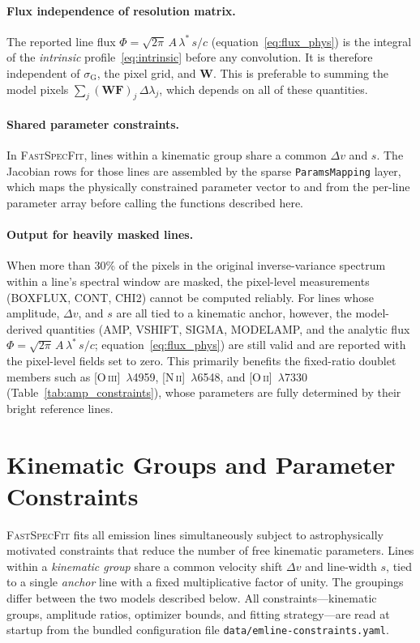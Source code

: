 \documentclass[12pt]{article}
\newcommand{\lstar}{\lambda^{*}}
\newcommand{\sG}{\sigma_{\mathrm{G}}}
\newcommand{\C}{c}                             %
\newcommand{\W}{\mathbf{W}}
\begin{document}
\paragraph{Flux independence of resolution matrix.}
The reported line flux $\Phi = \sqrt{2\pi}\,A\,\lstar\,s/\C$
(equation~\ref{eq:flux_phys}) is the integral of the \emph{intrinsic}
profile~\eqref{eq:intrinsic} before any convolution.  It is therefore
independent of $\sG$, the pixel grid, and $\W$.  This is preferable to
summing the model pixels $\sum_j (\W\mathbf{F})_j\,\Delta\lambda_j$, which
depends on all of these quantities.

\paragraph{Shared parameter constraints.}
In \textsc{FastSpecFit}, lines within a kinematic group share a common $\Delta v$
and $s$.  The Jacobian rows for those lines are assembled by the sparse
\texttt{ParamsMapping} layer, which maps the physically constrained parameter
vector to and from the per-line parameter array before calling
the functions described here.

\paragraph{Output for heavily masked lines.}
When more than 30\% of the pixels in the original inverse-variance spectrum within
a line's spectral window are masked, the pixel-level measurements (BOXFLUX, CONT,
CHI2) cannot be computed reliably.  For lines whose amplitude, $\Delta v$, and $s$
are all tied to a kinematic anchor, however, the model-derived quantities (AMP,
VSHIFT, SIGMA, MODELAMP, and the analytic flux $\Phi = \sqrt{2\pi}\,A\,\lstar\,s/\C$;
equation~\ref{eq:flux_phys}) are still valid and are reported with the pixel-level
fields set to zero.  This primarily benefits the fixed-ratio doublet members such as
[O\,\textsc{iii}]~$\lambda$4959, [N\,\textsc{ii}]~$\lambda$6548, and
[O\,\textsc{ii}]~$\lambda$7330 (Table~\ref{tab:amp_constraints}), whose parameters
are fully determined by their bright reference lines.


\section{Kinematic Groups and Parameter Constraints}
\label{sec:kinematics}

\textsc{FastSpecFit} fits all emission lines simultaneously subject to astrophysically
motivated constraints that reduce the number of free kinematic parameters.  Lines within
a \emph{kinematic group} share a common velocity shift $\Delta v$ and line-width $s$,
tied to a single \emph{anchor} line with a fixed multiplicative factor of unity.  The
groupings differ between the two models described below.  All constraints---kinematic
groups, amplitude ratios, optimizer bounds, and fitting strategy---are read at startup
from the bundled configuration file \texttt{data/emline-constraints.yaml}.
\end{document}
